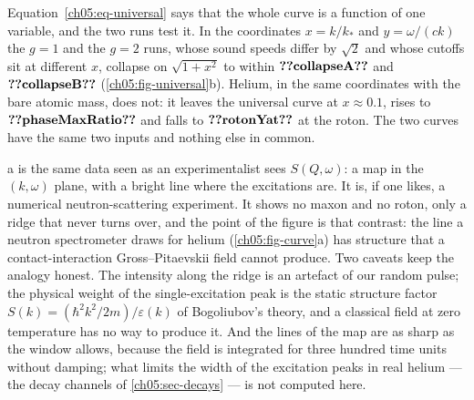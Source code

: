 Equation~\eqref{ch05:eq-universal} says that the whole curve is a function of one variable, and the two runs test it.
In the coordinates $x=k/k_\ast$ and $y=\omega/(ck)$ the $g=1$ and the $g=2$ runs, whose sound speeds differ by $\sqrt2$ and whose cutoffs sit at different $x$, collapse on $\sqrt{1+x^2}$ to within $\cfiveV{collapseA}$ and $\cfiveV{collapseB}$ (\cref{ch05:fig-universal}b).
Helium, in the same coordinates with the bare atomic mass, does not: it leaves the universal curve at $x\approx0.1$, rises to $\cfiveV{phaseMaxRatio}$ and falls to $\cfiveV{rotonYat}$ at the roton.
The two curves have the same two inputs and nothing else in common.

a is the same data seen as an experimentalist sees $S(Q,\omega)$: a map in the $(k,\omega)$ plane, with a bright line where the excitations are.
It is, if one likes, a numerical neutron-scattering experiment.
It shows no maxon and no roton, only a ridge that never turns over, and the point of the figure is that contrast: the line a neutron spectrometer draws for helium (\cref{ch05:fig-curve}a) has structure that a contact-interaction Gross--Pitaevskii field cannot produce.
Two caveats keep the analogy honest.
The intensity along the ridge is an artefact of our random pulse; the physical weight of the single-excitation peak is the static structure factor $S(k)=(\hbar^2k^2/2m)/\varepsilon(k)$ of Bogoliubov's theory, and a classical field at zero temperature has no way to produce it.
And the lines of the map are as sharp as the window allows, because the field is integrated for three hundred time units without damping; what limits the width of the excitation peaks in real helium --- the decay channels of \cref{ch05:sec-decays} --- is not computed here.

